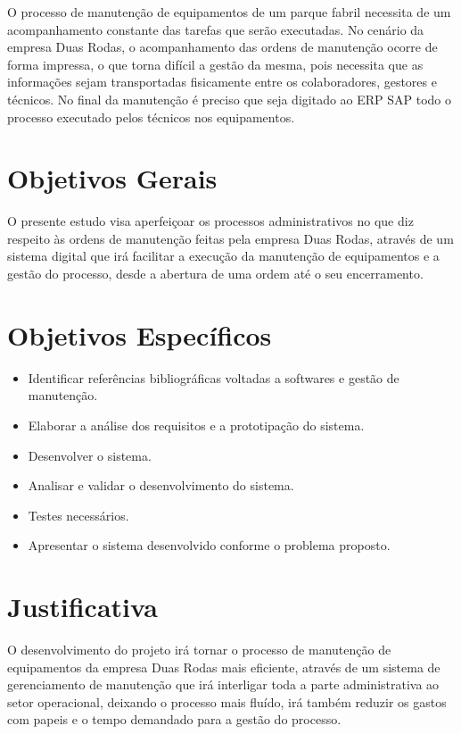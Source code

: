 O processo de manutenção de equipamentos de um parque fabril necessita de um acompanhamento constante das tarefas que serão executadas. No cenário da empresa Duas Rodas, o acompanhamento das ordens de manutenção ocorre de forma impressa, o que torna difícil a gestão da mesma, pois necessita que as informações sejam transportadas fisicamente entre os colaboradores, gestores e técnicos. No final da manutenção é preciso que seja digitado ao ERP SAP todo o processo executado pelos técnicos nos equipamentos.

\section{Objetivos Gerais}

O presente estudo visa aperfeiçoar os processos administrativos no que diz respeito às ordens de manutenção feitas pela empresa Duas Rodas, através de um sistema digital que irá facilitar a execução da manutenção de equipamentos e a gestão do processo, desde a abertura de uma ordem até o seu encerramento.

\section{Objetivos Específicos}

\begin{itemize}
	\item Identificar referências bibliográficas voltadas a softwares e gestão de manutenção.
	\item Elaborar a análise dos requisitos e a prototipação do sistema.
	\item Desenvolver o sistema.
	\item Analisar e validar o desenvolvimento do sistema.
	\item Testes necessários.
	\item Apresentar o sistema desenvolvido conforme o problema proposto.
\end{itemize}


\section{Justificativa}

O desenvolvimento do projeto irá tornar o processo de manutenção de equipamentos da empresa Duas Rodas mais eficiente, através de um sistema de gerenciamento de manutenção que irá interligar toda a parte administrativa ao setor operacional, deixando o processo mais fluído, irá também reduzir os gastos com papeis e o tempo demandado para a gestão do processo.

